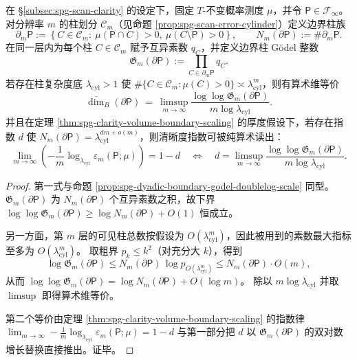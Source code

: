 
\begin{theorem}\label{thm:spg-boundary-cylinder-godelization-clarity}
在 \S\ref{subsec:spg-scan-clarity} 的设定下，固定 \(T\)-不变概率测度 \(\mu\)，并令 \(\mathsf P\in\mathcal F_\infty\)。
对分辨率 \(m\) 的柱划分 \(\mathcal C_m\)（见命题 \ref{prop:spg-scan-error-cylinder}）定义边界柱族
\[
\partial_m\mathsf P
:=\left\{C\in\mathcal C_m:\ \mu(\mathsf P\cap C)>0,\ \mu(C\setminus \mathsf P)>0\right\},
\qquad
N_m(\partial\mathsf P):=\#\partial_m\mathsf P.
\]
在同一层内为每个柱 \(C\in\mathcal C_m\) 赋予互异素数 \(q_C\)，并定义边界柱 Gödel 整数
\[
\mathfrak G_m(\partial\mathsf P):=\prod_{C\in\partial_m\mathsf P} q_C.
\]
若存在柱复杂度底 \(\lambda_{\mathrm{cyl}}>1\) 使 \(\#\{C\in\mathcal C_m:\mu(C)>0\}\asymp \lambda_{\mathrm{cyl}}^m\)，则有算术维等价
\[
\overline{\dim}_B(\partial\mathsf P)
\ =\
\limsup_{m\to\infty}\frac{\log\log \mathfrak G_m(\partial\mathsf P)}{m\log\lambda_{\mathrm{cyl}}}.
\]
并且在定理 \ref{thm:spg-clarity-volume-boundary-scaling} 的厚度假设下，若存在指数 \(d\) 使 \(N_m(\partial\mathsf P)=\lambda_{\mathrm{cyl}}^{dm+o(m)}\)，则清晰度指数可被纯算术读出：
\[
\lim_{m\to\infty}\left(-\frac{1}{m}\log_{\lambda_{\mathrm{cyl}}}\varepsilon_m(\mathsf P;\mu)\right)=1-d
\quad\Longleftrightarrow\quad
d=\limsup_{m\to\infty}\frac{\log\log \mathfrak G_m(\partial\mathsf P)}{m\log\lambda_{\mathrm{cyl}}}.
\]
\end{theorem}
\begin{proof}
第一式与命题 \ref{prop:spg-dyadic-boundary-godel-doublelog-scale} 同型。
\(\mathfrak G_m(\partial\mathsf P)\) 为 \(N_m(\partial\mathsf P)\) 个互异素数之积，故下界
\(
\log\log \mathfrak G_m(\partial\mathsf P)\ge \log N_m(\partial\mathsf P)+O(1)
\)
恒成立。
\par
另一方面，第 \(m\) 层的可见柱总数按假设为 \(O(\lambda_{\mathrm{cyl}}^m)\)，因此被用到的素数最大指标至多为 \(O(\lambda_{\mathrm{cyl}}^m)\)。
取粗界 \(p_k\le k^2\)（对充分大 \(k\)），得到
\[
\log \mathfrak G_m(\partial\mathsf P)
\le
N_m(\partial\mathsf P)\,\log p_{O(\lambda_{\mathrm{cyl}}^m)}
\le
N_m(\partial\mathsf P)\cdot O(m),
\]
从而 \(\log\log \mathfrak G_m(\partial\mathsf P)=\log N_m(\partial\mathsf P)+O(\log m)\)。
除以 \(m\log\lambda_{\mathrm{cyl}}\) 并取 \(\limsup\) 即得算术维等价。
\par
第二个等价由定理 \ref{thm:spg-clarity-volume-boundary-scaling} 的指数律
\(
\lim_{m\to\infty}-\frac1m\log_{\lambda_{\mathrm{cyl}}}\varepsilon_m(\mathsf P;\mu)=1-d
\)
与第一部分把 \(d\) 以 \(\mathfrak G_m(\partial\mathsf P)\) 的双对数增长替换直接推出。证毕。
\end{proof}

\endinput
